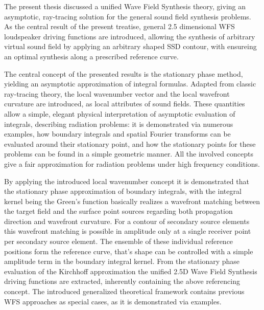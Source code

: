 The present thesis discussed a unified Wave Field Synthesis theory, giving an asymptotic, ray-tracing solution for the general sound field synthesis problems.
As the central result of the present treatise, general 2.5 dimensional WFS loudspeaker driving functions are introduced, allowing the synthesis of arbitrary virtual sound field by applying an arbitrary shaped SSD contour, with ensureing an optimal synthesis along a prescribed reference curve.

The central concept of the presented results is the stationary phase method, yielding an asymptotic approximation of integral formulas.
Adapted from classic ray-tracing theory, the local wavenumber vector and the local wavefront curvature are introduced, as local attributes of sound fields.
These quantities allow a simple, elegant physical interpretation of asymptotic evaluation of integrals, describing radiation problems: it is demonstrated via numerous examples, how boundary integrals and spatial Fourier transforms can be evaluated around their stationary point, and how the stationary points for these problems can be found in a simple geometric manner.
All the involved concepts give a fair approximation for radiation problems under high frequency conditions.

By applying the introduced local wavenumber concept it is demonstrated that the stationary phase approximation of boundary integrals, with the integral kernel being the Green's function basically realizes a wavefront matching between the target field and the surface point sources regarding both propagation direction and wavefront curvature.
For a contour of secondary source elements this wavefront matching is possible in amplitude only at a single receiver point per secondary source element.
The ensemble of these individual reference positions form the reference curve, that's shape can be controlled with a simple amplitude term in the boundary integral kernel.
From the stationary phase evaluation of the Kirchhoff approximation the unified 2.5D Wave Field Synthesis driving functions are extracted, inherently containing the above referencing concept.
The introduced generalized theoretical framework contains previous WFS approaches as special cases, as it is demonstrated via examples.

